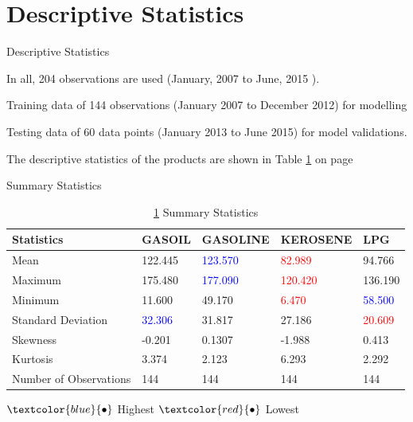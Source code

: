 \documentclass{beamer}
\newcommand{\colorPrimary}{blue}
\newcommand{\colorWarning}{red}
\newcommand{\textPrimary}[1]{\textcolor{\colorPrimary}{#1}}
\newcommand{\tPrim}[1]{\textcolor{\colorPrimary}{#1}}
\newcommand{\textWarning}[1]{\textcolor{\colorWarning}{#1}}
\newcommand{\tWarn}[1]{\textcolor{\colorWarning}{#1}}
\newcommand{\startDate}{January, 2007 }
\newcommand{\finishDate}{June, 2015 }
\newcommand{\numOfObservations}{204 }
\begin{document}
	\section{Descriptive Statistics}
	\begin{frame}{Descriptive Statistics}
		\begin{block}{}
			\vspace{4pt}
			In all, \numOfObservations observations are used (\startDate to \finishDate). \vspace{4pt}
		\end{block} \vspace{5pt}
		
		\begin{block}{}
		Training data of 144 observations (January 2007 to December 2012) for modelling \\ \vspace{5pt}
		
		Testing data of 60 data points (January 2013 to June 2015) for model validations.
		\end{block} \vspace{5pt}
	
		\begin{block}{}
			The descriptive statistics of the products are shown in Table \ref{table:description} on page \pageref{table:description}
		\end{block}
	\end{frame}
	
	\begin{frame}{Summary Statistics}
		\begin{table}[]
			\caption{ \ref{table:description} Summary Statistics}
			\begin{tabular}{lllll}
				\toprule
				Statistics  & GASOIL  & GASOLINE & KEROSENE & LPG \\ 
				\midrule
				
				Mean    & 122.445 & \tPrim{123.570} & \tWarn{82.989} & 94.766  \\ [5pt]
				Maximum & 175.480 & \tPrim{177.090} & \tWarn{120.420} & 136.190 \\ [5pt]
				Minimum & 11.600  & 49.170 & \tWarn{6.470} & \tPrim{58.500} \\ [5pt]
		Standard Deviation & \tPrim{32.306} & 31.817 & 27.186 & \tWarn{20.609 }\\ [5pt]
				Skewness & -0.201  & 0.1307   & -1.988   & 0.413   \\ [5pt]
				Kurtosis & 3.374   & 2.123    & 6.293    & 2.292   \\ [5pt]
				Number of Observations & 144     & 144      & 144      & 144 \\
				\bottomrule
			\end{tabular}
			\label{table:description}
		\end{table}
		\begin{center}
			{\LARGE $\textPrimary{\bullet}$ } Highest \hspace{20pt}
			{\LARGE $ \textWarning{\bullet} $} Lowest
		\end{center}
		
	\end{frame}
\end{document}

